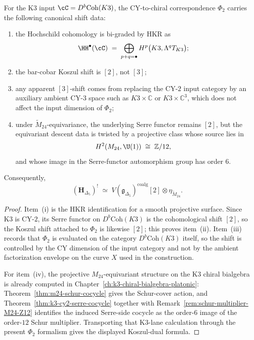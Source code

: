 \begin{theorem}
\label{thm:cy-to-chiral-cy2-shift-M24}
For the K3 input $\cC = D^b\mathrm{Coh}(K3)$, the CY-to-chiral correspondence
$\Phi_2$ carries the following canonical shift data:
\begin{enumerate}[label=\textup{(\roman*)}]
\item the Hochschild cohomology is bi-graded by HKR as
 \[
 \HH^\bullet(\cC)
 \;=\;
 \bigoplus_{p+q=\bullet} H^p\bigl(K3,\Lambda^q T_{K3}\bigr);
 \]
\item the bar-cobar Koszul shift is $[2]$, not $[3]$;
\item any apparent $[3]$-shift comes from replacing the CY-$2$ input category by an
 auxiliary ambient CY-$3$ space such as $K3\times\mathbb{C}$ or
 $K3\times\mathbb{C}^3$, which does not affect the input dimension of $\Phi_2$;
\item under $\widetilde{M}_{24}$-equivariance, the underlying Serre functor remains
 $[2]$, but the equivariant descent data is twisted by a projective class whose source
 lies in
 \[
 H^2(M_{24},\U(1))
 \;\cong\;
 \mathbb{Z}/12,
 \]
 and whose image in the Serre-functor automorphism group has order $6$.
\end{enumerate}
Consequently,
\[
 (\mathbf{H}_{\Delta_5})^{!}
 \;\simeq\;
 V(\mathfrak{g}_{\Delta_5})^{\mathrm{coalg}}[2]\otimes \eta_{\widetilde{M}_{24}}.
\]
\end{theorem}

\begin{proof}
Item~\textup{(i)} is the HKR identification for a smooth projective surface. Since K3
is CY-$2$, its Serre functor on $D^b\mathrm{Coh}(K3)$ is the cohomological shift
$[2]$, so the Koszul shift attached to $\Phi_2$ is likewise $[2]$; this proves
item~\textup{(ii)}. Item~\textup{(iii)} records that $\Phi_2$ is evaluated on the
category $D^b\mathrm{Coh}(K3)$ itself, so the shift is controlled by the CY dimension
of the input category and not by the ambient factorization envelope on the curve
$X$ used in the construction.

For item~\textup{(iv)}, the projective $M_{24}$-equivariant structure on the K3 chiral
bialgebra is already computed in Chapter~\ref{ch:k3-chiral-bialgebra-platonic}:
Theorem~\ref{thm:m24-schur-cocycle} gives the Schur-cover action, and
Theorem~\ref{thm:k3-cy2-serre-cocycle} together with
Remark~\ref{rem:schur-multiplier-M24-Z12} identifies the induced Serre-side cocycle as
the order-$6$ image of the order-$12$ Schur multiplier. Transporting that K3-lane
calculation through the present $\Phi_2$ formalism gives the displayed Koszul-dual
formula.
\end{proof}

